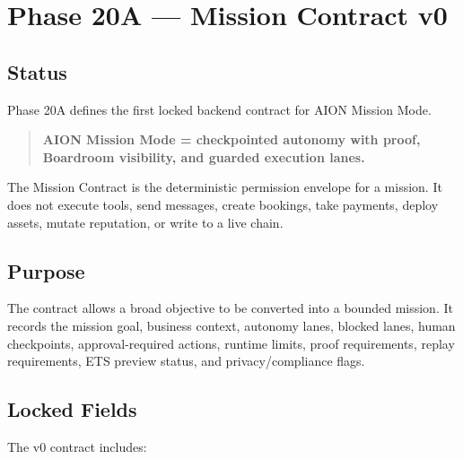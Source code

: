 \section{Phase 20A --- Mission Contract v0}
\label{sec:phase20a-mission-contract-v0}

\subsection{Status}

Phase 20A defines the first locked backend contract for AION Mission Mode.

\begin{quote}
\textbf{AION Mission Mode = checkpointed autonomy with proof, Boardroom visibility, and guarded execution lanes.}
\end{quote}

The Mission Contract is the deterministic permission envelope for a mission. It does not execute tools, send messages, create bookings, take payments, deploy assets, mutate reputation, or write to a live chain.

\subsection{Purpose}

The contract allows a broad objective to be converted into a bounded mission. It records the mission goal, business context, autonomy lanes, blocked lanes, human checkpoints, approval-required actions, runtime limits, proof requirements, replay requirements, ETS preview status, and privacy/compliance flags.

\subsection{Locked Fields}

The v0 contract includes:

